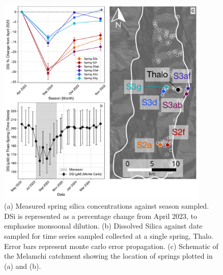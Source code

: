 \begin{figure}[h]
    \centering
    \includegraphics[width=0.9\textwidth]{Combined_Si_mM_Plots_with_Schematic.pdf}
    \caption{(a) Measured spring silica concentrations against season sampled. DSi is represented as a percentage change from April 2023, to emphasise monsoonal dilution. (b) Dissolved Silica against date sampled for time series sampled collected at a single spring, Thalo. Error bars represent monte carlo error propagation. (c) Schematic of the Melamchi catchment showing the location of springs plotted in (a) and (b).}
    \label{fig:time_series_changes}
\end{figure}

\FloatBarrier





















